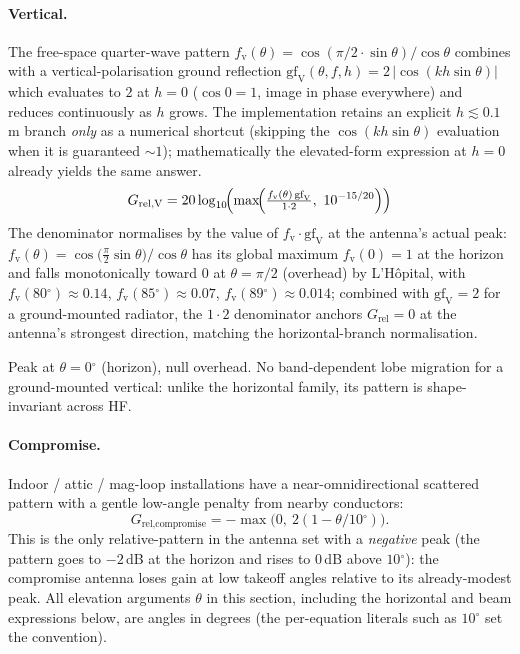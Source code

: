 \documentclass[11pt,a4paper]{article}
\newcommand{\degree}{\ensuremath{{}^\circ}}
\begin{document}
\paragraph{Vertical.}  The free-space quarter-wave pattern
$f_{\text{v}}(\theta) = \cos(\pi/2 \cdot \sin\theta)/\cos\theta$
combines with a vertical-polarisation ground reflection
$\text{gf}_{\text{V}}(\theta, f, h) =
2\,\bigl|\cos(k h \sin\theta)\bigr|$
which evaluates to $2$ at $h = 0$ ($\cos 0 = 1$, image in phase
everywhere) and reduces continuously as $h$ grows.  The
implementation retains an explicit $h \lesssim 0.1$\,m branch
\emph{only} as a numerical shortcut (skipping the
$\cos(k h \sin\theta)$ evaluation when it is guaranteed
${\sim}\!1$); mathematically the elevated-form expression at
$h = 0$ already yields the same answer.
\begin{equation}\label{eq:grelv}
  G_{\text{rel,V}} = 20\log_{10}\!\Bigl(\max\!\Bigl(
    \tfrac{f_{\text{v}}(\theta)\,\text{gf}_{\text{V}}}{1 \cdot 2},\ 10^{-15/20}
  \Bigr)\Bigr)
\end{equation}
The denominator normalises by the value of
$f_{\text{v}}\cdot\text{gf}_{\text{V}}$ at the antenna's actual
peak: $f_{\text{v}}(\theta) =
\cos\!\bigl(\frac{\pi}{2}\sin\theta\bigr)/\cos\theta$ has its
global maximum $f_{\text{v}}(0) = 1$ at the horizon and falls
monotonically toward $0$ at $\theta = \pi/2$ (overhead) by
L'H\^opital, with $f_{\text{v}}(80\degree)\approx 0.14$,
$f_{\text{v}}(85\degree)\approx 0.07$, $f_{\text{v}}(89\degree)
\approx 0.014$; combined with $\text{gf}_{\text{V}} = 2$ for a
ground-mounted radiator, the $1\cdot 2$ denominator anchors
$G_{\text{rel}} = 0$ at the antenna's strongest direction,
matching the horizontal-branch normalisation.

Peak at $\theta = 0\degree$ (horizon), null overhead.  No band-dependent
lobe migration for a ground-mounted vertical: unlike the horizontal
family, its pattern is shape-invariant across HF.

\paragraph{Compromise.}  Indoor / attic / mag-loop installations have
a near-omnidirectional scattered pattern with a gentle low-angle
penalty from nearby conductors:
\begin{equation}
  G_{\text{rel,compromise}} =
    -\max\!\bigl(0,\ 2(1 - \theta/10\degree)\bigr).
\end{equation}
This is the only relative-pattern in the antenna set with a
\emph{negative} peak (the pattern goes to $-2$\,dB at the horizon
and rises to $0$\,dB above $10\degree$): the compromise antenna
loses gain at low takeoff angles relative to its already-modest
peak.  All elevation arguments $\theta$ in this section, including
the horizontal and beam expressions below, are angles in degrees
(the per-equation literals such as $10\degree$ set the convention).
\end{document}
